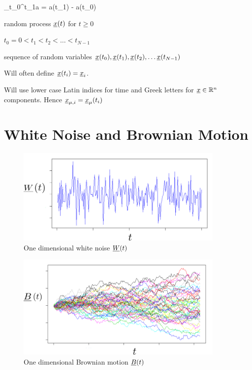 \beq
\Delta_{t_0}^{t_1}a = a(t_1) - a(t_0)
\eeq



random process ${\underline{x}}(t)$ for $t\geq 0$

$t_0=0 < t_1 < t_2 <\ldots< t_{N-1}$

sequence of random variables ${\underline{x}}(t_0),
 {\underline{x}}(t_1), {\underline{x}}(t_2), \ldots {\underline{x}}(t_{N-1})$
 
Will often define ${\underline{x}}(t_i) ={\underline{x}}_i$.

Will use lower case Latin indices for time
and Greek letters for ${\underline{x}}\in{ \mathbb{R}}^n$ components.
Hence ${\underline{x}}_{\mu, i}={\underline{x}}_\mu(t_i)$



 
 \section{White Noise and Brownian Motion}
 
 \begin{figure}[h!]
 \centering
 \includegraphics[width=4in]
 {stochastic-diff-eqns/white-noise-labeled}
 \caption{One dimensional white noise ${\underline{W}}(t)$}
 \label{fig-white-noise-t}
 \end{figure}
 
 \begin{figure}[h!]
  \centering
  \includegraphics[width=4in]
  {stochastic-diff-eqns/brownian-motion-labeled}
  \caption{One dimensional Brownian motion ${\underline{B}}(t)$}
  \label{fig-brownian-motion-t}
  \end{figure}
  

